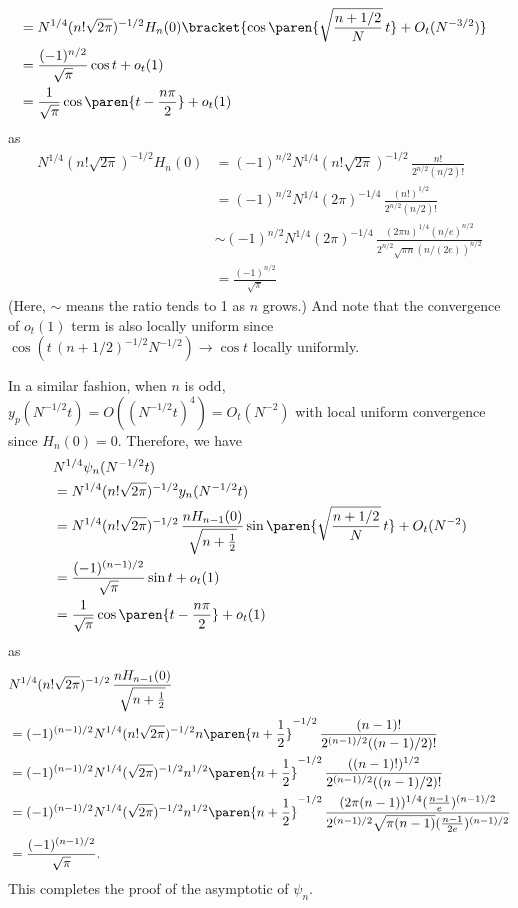 \documentclass{homework}
\begin{document}
{\begin{align*}
    \\ &= N^{1/4} (n! \sqrt{2\pi})^{-1/2} H_n(0)\bracket{ \cos\paren{\sqrt{\frac{n+1/2} N }\, t} + O_t(N^{-3/2}) }
    \\ &= \frac{(-1)^{n/2}}{\sqrt\pi}\cos t + o_t(1)
    \\ &= \frac1{\sqrt\pi}\cos\paren{t - \frac{n\pi}2} + o_t(1)
\end{align*}
as
\begin{align*}
    N^{1/4}(n!\sqrt{2\pi})^{-1/2}H_n(0) &= (-1)^{n/2} N^{1/4}(n!\sqrt{2\pi})^{-1/2} \,\frac{n!}{2^{n/2}(n/2)!}
    \\ &= (-1)^{n/2} N^{1/4}(2\pi)^{-1/4} \,\frac{(n!)^{1/2}}{2^{n/2}(n/2)!}
    \\ &\sim (-1)^{n/2} N^{1/4}(2\pi)^{-1/4} \,\frac{(2\pi n)^{1/4} (n/e)^{n/2}}{2^{n/2}\sqrt{\pi n}(n/(2e))^{n/2}}
    \\ &= \frac{(-1)^{n/2}}{\sqrt\pi}
\end{align*}
(Here, $\sim$ means the ratio tends to 1 as $n$ grows.) And note that the convergence of $o_t(1)$ term is also locally uniform since $\cos(t\,(n+1/2)^{-1/2}N^{-1/2})\to \cos t$ locally uniformly.

In a similar fashion, when $n$ is odd, $y_p(N^{-1/2}t) = O((N^{-1/2}t)^4) = O_t(N^{-2})$ with local uniform convergence since $H_n(0) = 0$. Therefore, we have
\begin{align*}
    & N^{1/4} \psi_n(N^{-1/2}t)
    \\ &= N^{1/4} (n! \sqrt{2\pi})^{-1/2} y_n(N^{-1/2}t)
    \\ &= N^{1/4} (n! \sqrt{2\pi})^{-1/2} \,\frac{nH_{n-1}(0)}{\sqrt{n+\frac12}}\sin\paren{\sqrt{\frac{n+1/2} N }\, t} + O_t(N^{-2}) 
    \\ &= \frac{(-1)^{(n-1)/2}}{\sqrt\pi}\sin t + o_t(1)
    \\ &=\frac1 {\sqrt\pi}\cos\paren{t - \frac{n\pi}2} + o_t(1)
\end{align*}
as
\begin{align*}
    & N^{1/4} (n! \sqrt{2\pi})^{-1/2} \,\frac{nH_{n-1}(0)}{\sqrt{n+\frac12}}
    \\ &= (-1)^{(n-1)/2} N^{1/4}(n!\sqrt{2\pi})^{-1/2} n \paren{n+\frac12}^{-1/2} \,\frac{(n-1)!}{2^{(n-1)/2}((n-1)/2)!}
    \\ &= (-1)^{(n-1)/2} N^{1/4}(\sqrt{2\pi})^{-1/2} n^{1/2} \paren{n+\frac12}^{-1/2} \,\frac{((n-1)!)^{1/2}}{2^{(n-1)/2}((n-1)/2)!}
    \\ &= (-1)^{(n-1)/2} N^{1/4}(\sqrt{2\pi})^{-1/2} n^{1/2} \paren{n+\frac12}^{-1/2} \,\frac{(2\pi (n-1))^{1/4} (\frac{n-1}e)^{(n-1)/2}}{2^{(n-1)/2}\sqrt{\pi(n-1)}(\frac{n-1}{2e})^{(n-1)/2}}
    \\ &= \frac{(-1)^{(n-1)/2}}{\sqrt\pi}.
\end{align*}
This completes the proof of the asymptotic of $\psi_n$.
}
\end{document}
